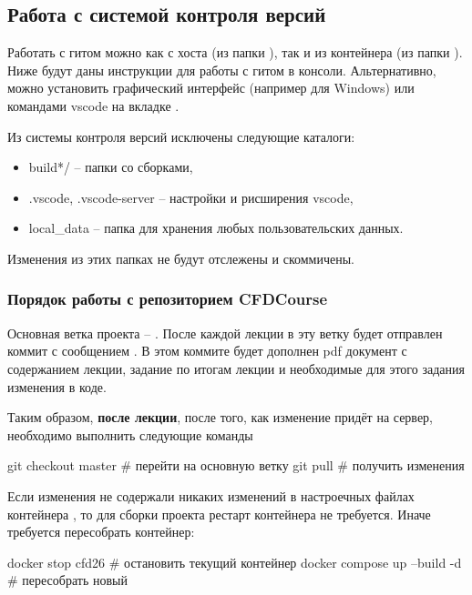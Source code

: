\subsection{Работа с системой контроля версий}
Работать с гитом можно как с хоста (из папки ),  так и из контейнера (из папки \ename{\app}).
Ниже будут даны инструкции для работы с гитом в консоли.
Альтернативно, можно установить графический интерфейс (например  для Windows)
или командами vscode на вкладке .

Из системы контроля версий исключены следующие каталоги:
\begin{itemize}
\item build*/   -- папки со сборками,
\item .vscode, .vscode-server -- настройки и рисширения vscode,
\item local\_data -- папка для хранения любых пользовательских данных.
\end{itemize}
Изменения из этих папках не будут отслежены и скоммичены.

\subsubsection{Порядок работы с репозиторием CFDCourse}

Основная ветка проекта -- . После каждой лекции в эту ветку будет отправлен коммит с сообщением .
В этом коммите будет дополнен pdf документ с содержанием лекции, задание по итогам лекции и необходимые для этого задания изменения в коде.

Таким образом, {\bf после лекции}, после того, как изменение  придёт на сервер, необходимо выполнить следующие команды
\begin{shelloutput}
git checkout master  # перейти на основную ветку
git pull             # получить изменения
\end{shelloutput}

Если изменения не содержали никаких изменений в настроечных файлах контейнера ,
то для сборки проекта рестарт контейнера не требуется.
Иначе требуется пересобрать контейнер:
\begin{shelloutput}
docker stop cfd26            # остановить текущий контейнер
docker compose up --build -d # пересобрать новый
\end{shelloutput}


